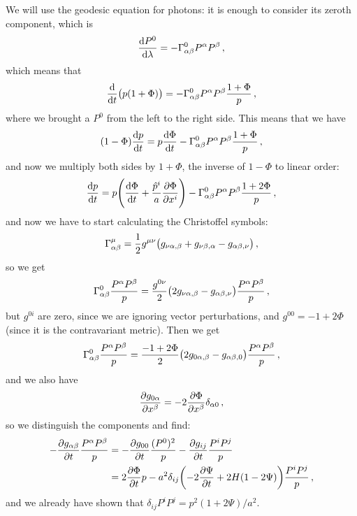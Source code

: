 \documentclass[main.tex]{subfiles}
\begin{document}
We will use the geodesic equation for photons: it is enough to consider its zeroth component, which is 
%
\begin{align}
\dv{P^{0}}{\lambda } = - \Gamma^{0}_{\alpha \beta } P^{\alpha } P^{\beta }
\,,
\end{align}
%
which means that 
%
\begin{align}
\dv{}{t} \qty(p (1+ \Phi )) = - \Gamma^{0}_{\alpha \beta } P^{\alpha } P^{\beta } \frac{1+\Phi }{p}
\,,
\end{align}
%
where we brought a \(P^{0}\) from the left to the right side. This means that we have 
%
\begin{align}
(1-\Phi ) \dv{p}{t} 
= p \dv{\Phi }{t} - \Gamma^{0}_{\alpha \beta } 
P^{\alpha } P^{\beta } \frac{1+\Phi }{p}
\,,
\end{align}
%
and now we multiply both sides by \(1+\Phi \), the inverse of \(1 - \Phi \) to linear order: 
%
\begin{align}
\dv{p}{t} = p \qty(\dv{\Phi }{t} + \frac{\hat{p}^{i}  }{a} \pdv{\Phi }{x^{i}}) 
- \Gamma^{0}_{\alpha \beta } P^{\alpha } P^{\beta } \frac{1+2\Phi }{p}
\,,
\end{align}
%
and now we have to start calculating the Christoffel symbols: 
%
\begin{align}
\Gamma^{\mu }_{\alpha \beta } = \frac{1}{2} g^{\mu \nu } \qty(g_{\nu \alpha , \beta } + g_{\nu \beta , \alpha } - g_{\alpha \beta , \nu })
\,,
\end{align}
%
so we get 
%
\begin{align}
\Gamma^{0}_{\alpha \beta } \frac{P^{\alpha }P^{\beta }}{p}
= \frac{g^{0\nu }}{2} \qty(2 g_{\nu \alpha , \beta } - g_{\alpha \beta , \nu }) \frac{P^{\alpha }P^{\beta }}{p}
\,,
\end{align}
%
but \(g^{0i}\) are zero, since we are ignoring vector perturbations, and \(g^{00} = -1 + 2\Phi \) (since it is the contravariant metric). Then we get 
%
\begin{align}
\Gamma^{0}_{\alpha \beta } \frac{P^{\alpha }P^{\beta }}{p}
= \frac{-1 + 2 \Phi }{2} \qty(2 g_{0 \alpha , \beta } - g_{\alpha \beta , 0 }) \frac{P^{\alpha }P^{\beta }}{p}
\,,
\end{align}
%
and we also have 
%
\begin{align}
\pdv{g_{0 \alpha }}{x^{\beta }}
= - 2 \pdv{\Phi }{x^{\beta }} \delta_{\alpha 0}
\,,
\end{align}
%
so we distinguish the components and find: 
%
\begin{align}
- \pdv{g_{\alpha \beta }}{t} \frac{P^{\alpha } P^{\beta }}{p} &= - \pdv{g_{00} }{t} \frac{(P^{0})^2}{p} - \pdv{g_{ij}}{t} \frac{P^{i} P^{j}}{p} \\
&= 2 \pdv{\Phi }{t} p - a^2 \delta_{ij} \qty(-2 \pdv{\Psi }{t} + 2 H (1- 2 \Psi )) \frac{P^{i} P^{j}}{p}
\,,
\end{align}
%
and we already have shown that \(\delta_{ij} P^{i} P^{j} = p^2 (1 + 2 \Psi ) / a^2\).
\end{document}
